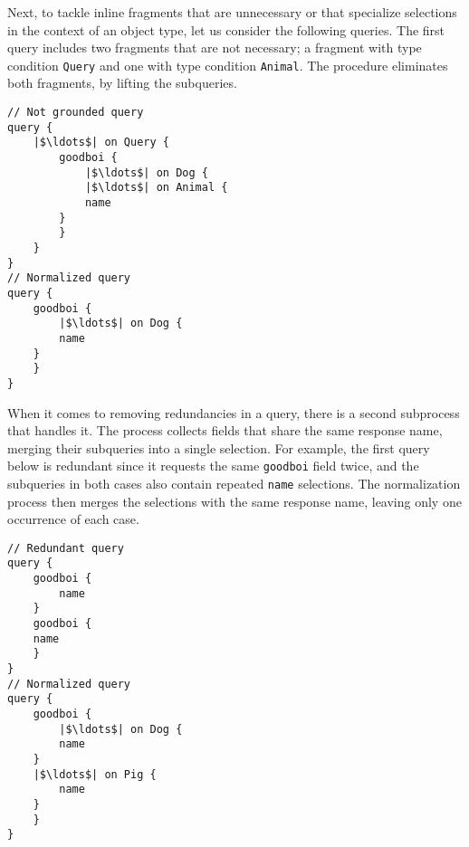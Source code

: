 Next, to tackle inline fragments that are unnecessary or that specialize selections in the context of an object type, let us consider the following queries. The first query includes two fragments that are not necessary; a fragment with type condition \texttt{Query} and one with type condition \texttt{Animal}. The procedure eliminates both fragments, by lifting the subqueries.

\begin{verbatim}
// Not grounded query
query {
    |$\ldots$| on Query {
        goodboi {
            |$\ldots$| on Dog {
	        |$\ldots$| on Animal {
		    name
		}
	    }
	}
}
// Normalized query
query {
    goodboi {
        |$\ldots$| on Dog {
	    name
	}
    }	
}
\end{verbatim} 

When it comes to removing redundancies in a query, there is a second subprocess that handles it. The process collects fields that share the same response name, merging their subqueries into a single selection. For example, the first query below is redundant since it requests the same \texttt{goodboi} field twice, and the subqueries in both cases also contain repeated \texttt{name} selections. The normalization process then merges the selections with the same response name, leaving only one occurrence of each case.

\begin{verbatim}
// Redundant query
query {
    goodboi {
        name
    }
    goodboi { 
 	name
    } 
}
// Normalized query
query {
    goodboi {
        |$\ldots$| on Dog {
	    name
	}
	|$\ldots$| on Pig {
	    name
	}
    }	
}
\end{verbatim} 



\iffalse
\begin{verbatim}
 Definition normalize_queries (s : wfGraphQLSchema)
                             (type_in_scope : Name)
                             (queries : seq Query) :
                                         seq Query :=
    if is_object_type s type_in_scope then
        normalize s type_in_scope queries
    else
        [seq on t { normalize s t queries } |
            t <- get_possible_types s type_in_scope].

\end{verbatim}
\fi

